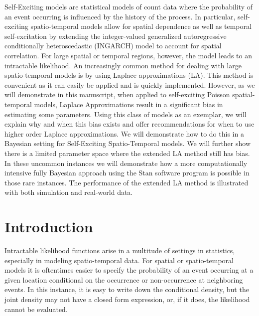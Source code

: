 \documentclass[11pt]{isuthesis}
\begin{document}
	Self-Exciting models are statistical models of count data where the probability of an event occurring is influenced by the history of the process.  In particular, self-exciting spatio-temporal models allow for spatial dependence as well as temporal self-excitation by extending the integer-valued generalized autoregressive conditionally heteroscedastic (INGARCH) model to account for spatial correlation.  For large spatial or temporal regions, however, the model leads to an intractable likelihood.  An increasingly common method for dealing with large spatio-temporal models is by using Laplace approximations (LA).  This method is convenient as it can easily be applied and is quickly implemented.  However, as we will demonstrate in this manuscript, when applied to self-exciting Poisson spatial-temporal models, Laplace Approximations result in a significant bias in estimating some parameters.  Using this class of models as an exemplar, we will explain why and when this bias exists and offer recommendations for when to use higher order Laplace approximations.  We will demonstrate how to do this in a Bayesian setting for Self-Exciting Spatio-Temporal models.  We will further show there is a limited parameter space where the extended LA method still has bias.  In these uncommon instances we will demonstrate how a more computationally intensive fully Bayesian approach using the Stan software program is possible in those rare instances.  The performance of the extended LA method is illustrated with both simulation and real-world data.
	\section{Introduction} 
	
	Intractable likelihood functions arise in a multitude of settings in statistics, especially in modeling spatio-temporal data.  For spatial or spatio-temporal models it is oftentimes easier to specify the probability of an event occurring at a given location conditional on the occurrence or non-occurrence at neighboring events.  In this instance, it is easy to write down the conditional density, but the joint density may not have a closed form expression, or, if it does, the likelihood cannot be evaluated.  
	
\end{document}

